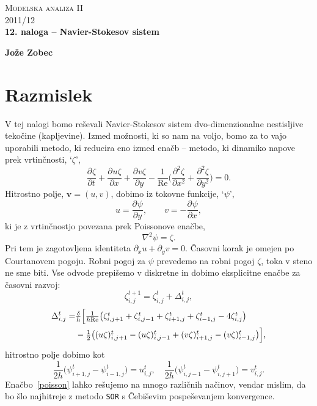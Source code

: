 \documentclass[a4 paper, 12pt]{article}
\renewcommand{\d}{
    \ensuremath{\delta}
}
\newcommand{\der}[3][]{
    \ensuremath{ \frac{\partial^{#1} #2}{\partial #3^{#1}} }
}
\renewcommand{\Re}{
    \ensuremath{\mathrm{Re}}
}
\newcommand{\sfrac}[2]{
    \ensuremath{\textstyle{\frac{#1}{#2}}}
}
\newcommand{\z}{
    \ensuremath{\zeta}
}
\newcommand{\V}{
    \ensuremath{\mathbf{v}}
}
\begin{document}
\begin{center}
\textsc{Modelska analiza II}\\
\textsc{2011/12}\\[0.5cm]
\textbf{12. naloga -- Navier-Stokesov sistem}
\end{center}
\begin{flushright}
\textbf{Jože Zobec}\\
\end{flushright}

\section{Razmislek}

V tej nalogi bomo re\v sevali Navier-Stokesov sistem dvo-dimenzionalne nestisljive
teko\v cine (kapljevine). Izmed mo\v znosti, ki so nam na voljo, bomo za to vajo
uporabili metodo, ki reducira eno izmed ena\v cb -- metodo, ki dinamiko napove prek
vrtin\v cnosti, `$\zeta$',
\[
    \der{\zeta}{t} + \der{u\zeta}{x} + \der{v\zeta}{y} - \frac{1}{\Re}\bigg(\der[2]{\zeta}{x}
        + \der[2]{\zeta}{y}\bigg) = 0.
\]
Hitrostno polje, $\V = (u, v)$, dobimo iz tokovne funkcije, `$\psi$', 
\[
    u = \der{\psi}{y}, \qquad v = -\der{\psi}{x},
\]
ki je z vrtin\v cnostjo povezana prek Poissonove ena\v cbe,
\begin{equation}
    \nabla^2 \psi = \zeta.
    \label{poisson}
\end{equation}
Pri tem je zagotovljena identiteta $\partial_x u + \partial_y v = 0$. \v Casovni korak je omejen
po Courtanovem pogoju. Robni pogoj za $\psi$ prevedemo na robni pogoj $\zeta$, toka v steno ne
sme biti. Vse odvode prepi\v semo v diskretne in dobimo eksplicitne ena\v cbe za \v casovni razvoj:
\begin{equation}
    \z_{i,j}^{t+1} = \z_{i,j}^{t} + \Delta_{i,j}^t,
\end{equation}
\begin{align}
    \Delta_{i,j}^t =& \sfrac{\d}{h}\Big[\sfrac{1}{h\Re}\big(\z^t_{i,j+1} + \z^t_{i,j-1} + \z^t_{i+1,j} +
        \z^t_{i-1,j} - 4\z^t_{i,j}\big) \notag \\
        &- \sfrac{1}{2}\big((u\z)^t_{i,j+1} - (u\z)^t_{i,j-1} + (v\z)^t_{i+1,j} - (v\z)^t_{i-1,j}\big)\Big],
\end{align}
hitrostno polje dobimo kot
\begin{equation}
    \sfrac{1}{2h}\big(\psi^t_{i+1,j} - \psi^t_{i-1,j}\big) = u^t_{i,j}, \quad
    \sfrac{1}{2h}\big(\psi^t_{i,j-1} - \psi^t_{i,j+1}\big) = v^t_{i,j}.
\end{equation}
Ena\v cbo~\eqref{poisson} lahko re\v sujemo na mnogo razli\v cnih na\v cinov, vendar mislim,
da bo \v slo najhitreje z metodo {\tt SOR} s \v Cebi\v sevim pospe\v sevanjem konvergence.
\end{document}
